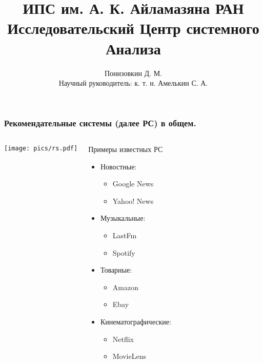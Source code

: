 \documentclass[10pt,xcolor={usenames,dvipsnames}]{beamer}
\theoremstyle{break}
\begin{document}
\title{ИПС им. А. К. Айламазяна РАН \\ Исследовательский Центр системного Анализа}
\author{Понизовкин Д. М.  \\ Научный руководитель: к. т. н. Амелькин С. А. } 


\frame{\titlepage} 

\begin{frame}
    \frametitle{Рекомендательные системы (далее РС) в общем.}
    \begin{columns}[T]
    \begin{block}{}
      \texttt{[image: pics/rs.pdf]}
    \end{block}

    \begin{block}{Примеры известных РС}
    \begin{center}
      \begin{itemize}
      \item Новостные: 
        \begin{itemize}
        \item Google News
        \item Yahoo! News 
        \end{itemize}
      \item Музыкальные:

        \begin{itemize}
        \item LastFm
        \item Spotify
        \end{itemize}
        
      \item Товарные:
        \begin{itemize}
        \item Amazon
        \item Ebay
        \end{itemize}

      \item Кинематографические:
        \begin{itemize}
        \item Netflix
        \item MovieLens
        \end{itemize}
      \end{itemize}
    \end{center}
    \end{block}
  \end{columns}
\end{frame}
\end{document}
